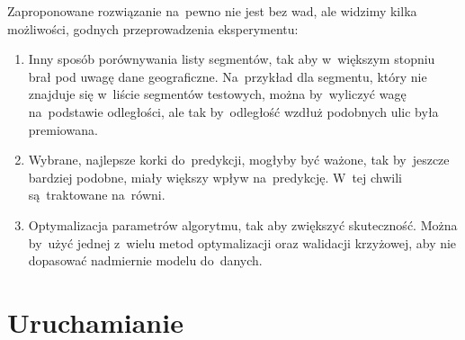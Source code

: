 \documentclass[a4paper,12pt]{mwart}
\begin{document}
Zaproponowane rozwiązanie na~pewno nie jest bez wad, ale widzimy kilka możliwości, godnych przeprowadzenia eksperymentu:

\begin{enumerate}
\item Inny sposób porównywania listy segmentów, tak aby w~większym stopniu brał pod uwagę dane geograficzne. Na~przykład dla segmentu, który nie znajduje się w~liście segmentów testowych, można by~wyliczyć wagę na~podstawie odległości, ale tak by~odległość wzdłuż podobnych ulic była premiowana.
\item Wybrane, najlepsze korki do~predykcji, mogłyby być ważone, tak by~jeszcze bardziej podobne, miały większy wpływ na~predykcję. W~tej chwili są~traktowane na~równi.
\item Optymalizacja parametrów algorytmu, tak aby zwiększyć skuteczność. Można by~użyć jednej z~wielu metod optymalizacji oraz walidacji krzyżowej, aby nie dopasować nadmiernie modelu do~danych.
\end{enumerate}

\section{Uruchamianie}
\end{document}

